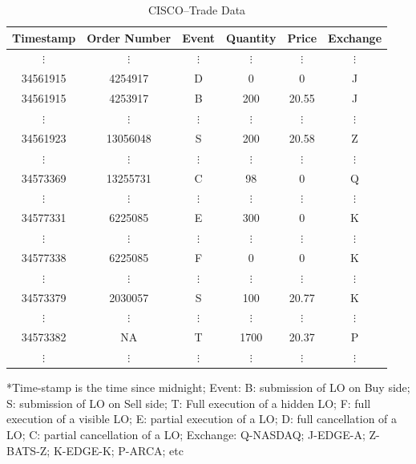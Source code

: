 	\begin{table}[!ht]
   	\centering
   	\caption{CISCO--Trade Data \label{tab:CISCO}}
   	\begin{tabular}{cccccc} 
	Timestamp & Order Number & Event & Quantity & Price & Exchange \\ \hline
	$\vdots$ & $\vdots$ & $\vdots$ & $\vdots$ & $\vdots$ & $\vdots$ \\
	34561915 & 4254917 & D & 0 & 0 & J \\
	34561915 & 4253917 & B & 200 & 20.55 & J \\
	$\vdots$ & $\vdots$ & $\vdots$ & $\vdots$ & $\vdots$ & $\vdots$ \\
	34561923 & 13056048 & S & 200 & 20.58 & Z \\
	$\vdots$ & $\vdots$ & $\vdots$ & $\vdots$ & $\vdots$ & $\vdots$ \\
	34573369 & 13255731 & C & 98 & 0 & Q \\
	$\vdots$ & $\vdots$ & $\vdots$ & $\vdots$ & $\vdots$ & $\vdots$ \\
	34577331 & 6225085 & E & 300 & 0 & K \\
	$\vdots$ & $\vdots$ & $\vdots$ & $\vdots$ & $\vdots$ & $\vdots$ \\
	34577338 & 6225085 & F & 0 & 0 & K \\
	$\vdots$ & $\vdots$ & $\vdots$ & $\vdots$ & $\vdots$ & $\vdots$ \\
	34573379 & 2030057 & S & 100 & 20.77 & K \\
	$\vdots$ & $\vdots$ & $\vdots$ & $\vdots$ & $\vdots$ & $\vdots$ \\
	34573382 & NA & T & 1700 & 20.37 & P \\
	$\vdots$ & $\vdots$ & $\vdots$ & $\vdots$ & $\vdots$ & $\vdots$ 
   	\end{tabular}
	\begin{minipage}[t]{1\textwidth}
	\small{*Time-stamp is the time since midnight; Event: B: submission of LO on Buy side; S: submission of LO on Sell side; T: Full execution of a hidden LO; F: full execution of a visible LO; E: partial execution of a LO; D: full cancellation of a LO; C: partial cancellation of a LO; Exchange: Q-NASDAQ; J-EDGE-A; Z-BATS-Z; K-EDGE-K; P-ARCA; etc}
	\end{minipage}
	\end{table}


